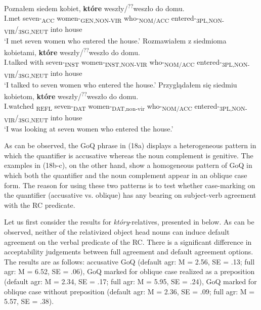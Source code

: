 \documentclass[output=paper]{langsci/langscibook}
\begin{document}
\ea%
    \label{ex:leska:18}
    \ea
    \gll Poznałem   siedem   kobiet,   \textbf{które}     weszły/\textsuperscript{??}weszło   do   domu.  \\
          I.met   seven-\textsubscript{ACC}   women-\textsubscript{GEN,NON-VIR}  who-\textsubscript{NOM/ACC} entered-\textsubscript{3PL,NON-VIR}/\textsubscript{3SG,NEUT}   into  house  \\
    \glt ‘I met seven women who entered the house.’
    \ex
    \gll Rozmawiałem   z   siedmioma  kobietami,  \textbf{które}                                                          weszły/\textsuperscript{??}weszło   do   domu.\\
         I.talked   with   seven-\textsubscript{INST}   women-\textsubscript{INST,NON-VIR}  who-\textsubscript{NOM/ACC}      entered-\textsubscript{3PL,NON-VIR}/\textsubscript{3SG,NEUT} into   house   \\
    \glt ‘I talked to seven women who entered the house.’
    \ex 
    \gll Przyglądałem się   siedmiu   kobietom,    \textbf{które}    weszły/\textsuperscript{??}weszło       do   domu.\\
         I.watched    \textsubscript{REFL}   seven-\textsubscript{DAT}   women-\textsubscript{DAT,non-vir}   who-\textsubscript{NOM/ACC} entered-\textsubscript{3PL,NON-VIR}/\textsubscript{3SG,NEUT}   into house \\
    \glt ‘I was looking at seven women who entered the house.’
    \z
\z
  
As can be observed, the GoQ phrase in (18a) displays a heterogeneous pattern in which the quantifier is accusative whereas the noun complement is genitive. The examples in (18b-c), on the other hand, show a homogeneous pattern of GoQ in which both the quantifier and the noun complement appear in an oblique case form. The reason for using these two patterns is to test whether case-marking on the quantifier (accusative vs. oblique) has any bearing on subject-verb agreement with the RC predicate.

Let us first consider the results for \textit{który}{}-relatives, presented in  below. As can be observed, neither of the relativized object head nouns can induce default agreement on the verbal predicate of the RC. There is a significant difference in acceptability judgements between full agreement and default agreement options. The results are as follows: accusative GoQ (default agr: M = 2.56, SE = .13; full agr: M = 6.52, SE = .06), GoQ marked for oblique case realized as a preposition (default agr: M = 2.34, SE = .17; full agr: M = 5.95, SE = .24), GoQ marked for oblique case without preposition (default agr: M = 2.36, SE = .09; full agr: M = 5.57, SE = .38).
\end{document}
